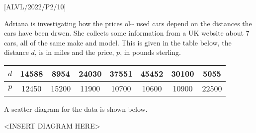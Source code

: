 \item {[}ALVL/2022/P2/10{]}

Adriana is investigating how the prices ol\textasciitilde{} used cars
depend on the distances the cars have been drwen. She collects some
information from a UK website about 7 cars, all of the same make and
model. This is given in the table below, the distance $d$, is in
miles and the price, $p$, in pounds sterling.
\noindent \begin{center}
\begin{tabular}{|c|c|c|c|c|c|c|c|}
\hline 
$d$ & 14588 & 8954 & 24030 & 37551 & 45452 & 30100 & 5055\tabularnewline
\hline 
$p$ & 12450 & 15200 & 11900 & 10700 & 10600 & 10900 & 22500\tabularnewline
\hline 
\end{tabular}
\par\end{center}

A scatter diagram for the data is shown below. 
\noindent \begin{center}
<INSERT DIAGRAM HERE>
\par\end{center}


